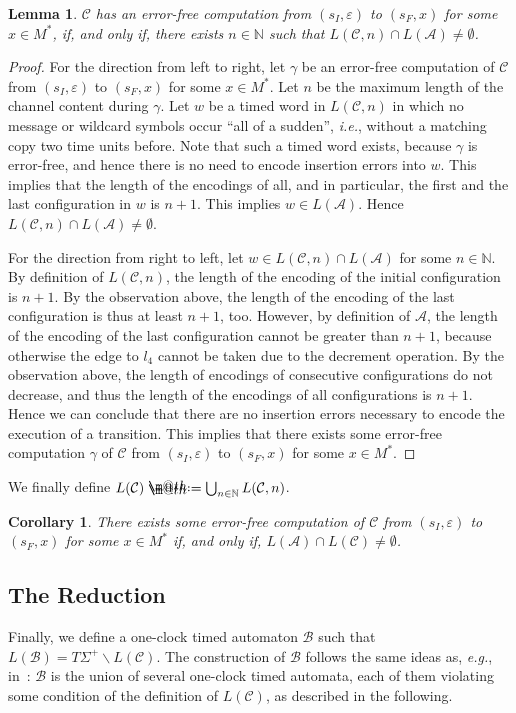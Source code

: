 \documentclass{CSML}
\makeatletter
\theoremstyle{plain}\newtheorem{theorem}[thm]{Theorem}
\theoremstyle{plain}\newtheorem{corollary}[thm]{Corollary}
\theoremstyle{plain}\newtheorem{example}[thm]{Example}
\theoremstyle{plain}\newtheorem{lemma}[thm]{Lemma}
\theoremstyle{plain}\newtheorem{remark}[thm]{Remark}
\def\eg{{\em e.g.}}
\newcommand{\N}{\mathbb{N}}
\newcommand{\B}{\mathcal{B}}
\newcommand{\loc}{\mathit{l}}
\newcommand{\TW}{T\Sigma^+}
\newcommand*\ie{\textit{i.e.}}
\newcommand{\A}{\mathcal{A}}
\newcommand{\cm}{\mathcal{C}}
\newcommand*{\defeq}{\mathrel{\rlap{\raisebox{0.3ex}{$\m@th\cdot$}}\raisebox{-0.3ex}{$\m@th\cdot$}}=}
\makeatother
\begin{document}
\begin{lemma}
	\label{lemma_intersection}
	$\cm$ has an error-free computation from $(s_I,\varepsilon)$ 
	to $(s_F,x)$ for some $x\in M^*$, if, and only if, 
	there exists $n\in \N$  such that  $L(\cm,n)\cap L(\A)\neq \emptyset$.
\end{lemma}
\begin{proof}
	For the direction from left to right,
	let $\gamma$ be an error-free computation of $\cm$ from $(s_I,\varepsilon)$ to $(s_F,x)$ for some $x\in M^*$. 
	Let $n$ be the maximum length of the channel content during $\gamma$. 
	Let $w$ be a timed word in $L(\cm,n)$ in which no message or wildcard symbols occur ``all of a sudden'', \ie, without a matching copy two time units before. 
	Note that such a timed word exists, because $\gamma$ is error-free, and hence there is no need to encode insertion errors into $w$. 
	This implies that the length of the encodings of all, and in particular, the first and the last configuration in $w$ is $n+1$. 
	This implies $w\in L(\A)$.
	Hence $L(\cm,n)\cap L(\A)\neq\emptyset$. 
	
	
	
	
	For the direction from right to left, 
	let $w\in L(\cm,n)\cap L(\A)$ for some $n\in\N$. 
By definition of $L(\cm,n)$, 
	the length of the encoding of the initial configuration is $n+1$. 
	By the observation above, the length of the  encoding of the last configuration  is thus at least $n+1$, too. 	
	However, by definition of $\A$, 
	the length of the encoding of the last configuration cannot be greater than $n+1$, because otherwise the edge to $\loc_4$ cannot be taken due to the decrement operation. 
	By the observation above, the length of encodings of consecutive configurations do not decrease, and thus the length of the encodings of all configurations is $n+1$. Hence we can conclude that there are no insertion errors necessary to encode the execution of a transition. This implies that 
	there exists some error-free computation $\gamma$ of $\cm$ from $(s_I,\varepsilon)$ to $(s_F,x)$ for some $x\in M^*$. 	
\end{proof}
We finally define $L(\cm)\defeq\bigcup_{n\in\N} L(\cm,n)$.
	\begin{corollary}
		\label{corollary_cap}
		There exists some error-free computation of $\cm$ from $(s_I,\varepsilon)$ to $(s_F,x)$ for some $x\in M^*$ if, and only if, $L(\A)\cap L(\cm)\neq \emptyset$. 
	\end{corollary}
	
	
	\subsection{The Reduction}
	Finally, 
	we define a one-clock timed automaton $\B$ such that $L(\B)=\TW \backslash L(\cm)$. 
	The construction of $\B$ follows the same ideas as, \eg, in~\cite{DBLP:conf/formats/AdamsOW07}: 
	$\B$ is the union of several one-clock timed automata, each of them violating some condition of the definition of $L(\cm)$, as described in the following. 
	
\end{document}
